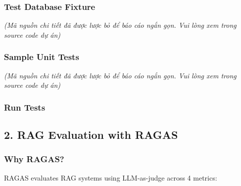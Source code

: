 \hypertarget{test-database-fixture}{%
\subsubsection{Test Database Fixture}}

\emph{(Mã nguồn chi tiết đã được lược bỏ để báo cáo ngắn gọn. Vui lòng
xem trong source code dự án)}

\hypertarget{sample-unit-tests}{%
\subsubsection{Sample Unit Tests}}

\emph{(Mã nguồn chi tiết đã được lược bỏ để báo cáo ngắn gọn. Vui lòng
xem trong source code dự án)}

\hypertarget{run-tests}{%
\subsubsection{Run Tests}}

\begin{Shaded}
\begin{Highlighting}[]
 

 

 \OperatorTok{=}\OperatorTok{=}\OperatorTok{=}\OperatorTok{=}
\end{Highlighting}
\end{Shaded}

\hypertarget{rag-evaluation-with-ragas}{%
\subsection{2. RAG Evaluation with
RAGAS}}

\hypertarget{why-ragas}{%
\subsubsection{Why RAGAS?}}

RAGAS evaluates RAG systems using LLM-as-judge across 4 metrics:

